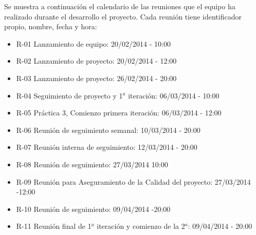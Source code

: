 Se muestra a continuación el calendario de las reuniones que el equipo ha realizado durante el desarrollo el proyecto. Cada reunión tiene identificador propio, nombre, fecha y hora:
\begin{itemize}
\item R-01 Lanzamiento de equipo: 	 20/02/2014 - 10:00
\item R-02 Lanzamiento de proyecto: 20/02/2014 - 12:00
\item R-03 Lanzamiento de proyecto: 26/02/2014 - 20:00
\item R-04 Seguimiento de proyecto y 1$^a$ iteración: 06/03/2014 - 10:00
\item R-05 Práctica 3, Comienzo primera iteración: 06/03/2014 - 12:00
\item R-06 Reunión de seguimiento semanal: 10/03/2014 - 20:00
\item R-07 Reunión interna de seguimiento: 12/03/2014 - 20:00 
\item R-08 Reunión de seguimiento: 27/03/2014 10:00
\item R-09 Reunión para Aseguramiento de la Calidad del proyecto: 27/03/2014 -12:00
\item R-10 Reunión de seguimiento: 09/04/2014 -20:00
\item R-11 Reunión final de 1$^a$ iteración y comienzo de la 2$^a$: 09/04/2014 - 20:00
\end{itemize}
